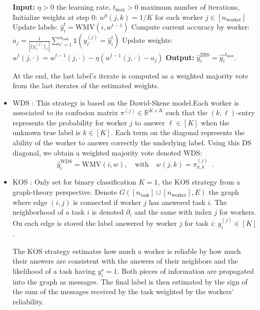 \documentclass{cap2024}
\begin{document}
\begin{itemize}
\begin{algorithm}
      \begin{algorithmic}[1]
        \State \textbf{Input:} $\eta>0$ the learning rate, $t_{\max}>0$ maximum number of iterations,
      \State Initialize weights at step $0$: $w^0(j,k)=1/K$ for each worker $j\in [n_\text{worker}]$
            \State Update labels: $\hat{y}_i^{t} = \mathrm{WMV}(i, w^{t-1})$
            \State Compute current accuracy by worker: $a_j =\frac{1}{|\{y_{i'}^{(j)}\}_{i'}|} \sum_{i'=1}^{n_{\mathrm{task}}} \mathds{1}\left(y_{i'}^{(j)} = \hat{y}_i^t\right)$
            \State Update weights: $w^t(j,\cdot) = w^{t-1}(j,\cdot) - \eta (w^{t-1}(j,\cdot)-a_j)$
        \EndFor
        \State \textbf{Output:} $\hat{y}_i^\text{ZBS} = \hat{y_i}^{t_{\max}}$.
      \end{algorithmic}
      \end{algorithm}
    At the end, the last label's iterate is computed as a weighted majority vote from the last iterates of the estimated weights.

  \item WDS \citep{dawid_maximum_1979}: This strategy is based on the Dawid-Skene model.Each worker is associated to its confusion matrix $\pi^{(j)}\in\mathbb{R}^{K\times K}$ such that the $(k,\ell)$-entry represents the probability for worker $j$ to answer $\ell\in[K]$ when the unknown true label is $k\in[K]$. Each term on the diagonal represents the ability of the worker to answer correctly the underlying label.
  Using this DS diagonal, we obtain a weighted majority vote denoted WDS:
  \begin{equation}
    \hat{y}_i^\text{WDS}= \mathrm{WMV}\left(i, w\right),\quad
    \text{with}\quad w(j,k) = \pi^{(j)}_{k,k}\enspace.
  \end{equation}
  \item KOS \citep{karger2011iterative}: Only set for binary classification $K=1$, the KOS strategy from a graph-theory perspective.
  Denote $G([n_\text{task}]\cup [n_\text{worker}], E)$ the graph where edge $(i,j)$ is connected if worker $j$ has answered task $i$. The neighborhood of a task $i$ is denoted $\partial_i$ and the same with index $j$ for workers.
  On each edge is stored the label answered by worker $j$ for task $i$: $y_i^{(j)}\in[K]$.

  The KOS strategy estimates how much a worker is reliable by how much their answers are consistent with the answers of their neighbors and the likelihood of a task having $y_i^\star=1$.
  Both pieces of information are propagated into the graph as messages.
  The final label is then estimated by the sign of the sum of the messages received by the task weighted by the workers' reliability.


\end{itemize}
\end{document}
